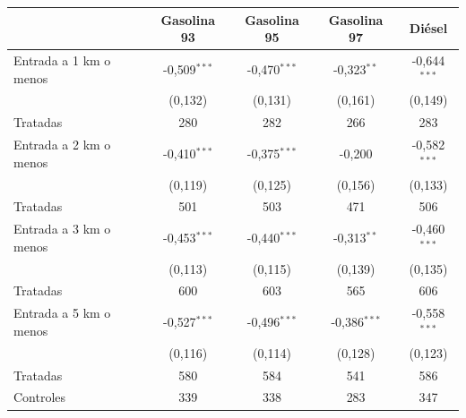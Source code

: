 \begin{tabular}{lcccc}
\toprule
 & Gasolina 93 & Gasolina 95 & Gasolina 97 & Diésel \\
\midrule
Entrada a 1 km o menos & -0{,}509$^{***}$ & -0{,}470$^{***}$ & -0{,}323$^{**}$ & -0{,}644$^{***}$ \\
 & (0{,}132) & (0{,}131) & (0{,}161) & (0{,}149) \\
\quad Tratadas & 280 & 282 & 266 & 283 \\
\addlinespace
Entrada a 2 km o menos & -0{,}410$^{***}$ & -0{,}375$^{***}$ & -0{,}200 & -0{,}582$^{***}$ \\
 & (0{,}119) & (0{,}125) & (0{,}156) & (0{,}133) \\
\quad Tratadas & 501 & 503 & 471 & 506 \\
\addlinespace
Entrada a 3 km o menos & -0{,}453$^{***}$ & -0{,}440$^{***}$ & -0{,}313$^{**}$ & -0{,}460$^{***}$ \\
 & (0{,}113) & (0{,}115) & (0{,}139) & (0{,}135) \\
\quad Tratadas & 600 & 603 & 565 & 606 \\
\addlinespace
Entrada a 5 km o menos & -0{,}527$^{***}$ & -0{,}496$^{***}$ & -0{,}386$^{***}$ & -0{,}558$^{***}$ \\
 & (0{,}116) & (0{,}114) & (0{,}128) & (0{,}123) \\
\quad Tratadas & 580 & 584 & 541 & 586 \\
\addlinespace
\midrule
Controles & 339 & 338 & 283 & 347 \\
\bottomrule
\end{tabular}

